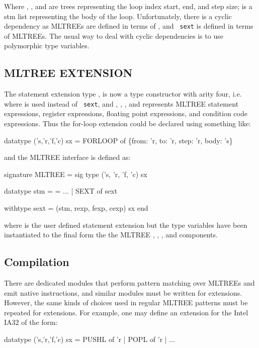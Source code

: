 Where , , and  are  trees representing
the loop index start, end, and step size;   is a stm list
representing the body of the loop. Unfortunately, there is a cyclic
dependency as MLTREEs are defined in terms of , and {\tt
sext} is defined in terms of MLTREEs. The usual way to deal with 
cyclic dependencies is to use polymorphic type variables. 

\subsection{MLTREE EXTENSION}

The statement extension type , is now a type constructor
with arity four, i.e. 
 where  is used instead of {\tt
sext}, and , , , and  represents
MLTREE statement expressions, register expressions, floating point
expressions, and condition code expressions. Thus the for-loop
extension could be declared using something like:
\begin{SML}
  datatype ('s,'r,'f,'c) sx 
    = FORLOOP of \{from: 'r, to: 'r, step: 'r, body: 's\}
\end{SML}
and the MLTREE interface is defined as:
\begin{SML}
  signature MLTREE = sig
    type ('s, 'r, 'f, 'c) sx

    datatype stm =
      = ...
      | SEXT of sext

   withtype sext = (stm, rexp, fexp, cexp) sx
  end
\end{SML}

where  is the user defined statement extension but the
type variables have been instantiated to the final form the the MLTREE 
, , , and  components. 

\subsection{Compilation}

There are dedicated modules that perform pattern matching over MLTREEs 
and emit native instructions, and similar modules must be written for
extensions.  However, the same kinds of choices used in regular MLTREE 
patterns must be repeated for extensions. For example, one may define
an extension for the Intel IA32 of the form:

\begin{SML}
  datatype ('s,'r,'f,'c) sx = PUSHL of 'r | POPL of 'r | ...
\end{SML}

